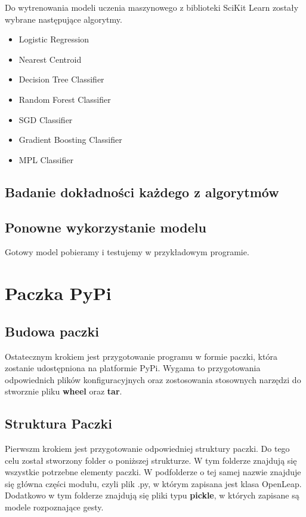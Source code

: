 \quad Do wytrenowania modeli uczenia maszynowego z biblioteki SciKit Learn zostały wybrane następujące algorytmy. 

\begin{itemize}
    \item Logistic Regression
    \item Nearest Centroid 
    \item Decision Tree Classifier 
    \item Random Forest Classifier 
    \item SGD Classifier
    \item Gradient Boosting Classifier
    \item MPL Classifier
\end{itemize}

\subsection{Badanie dokładności każdego z algorytmów}

\subsection{Ponowne wykorzystanie modelu}

\quad Gotowy model pobieramy i testujemy w przykładowym programie. 

\section{Paczka PyPi}

\subsection{Budowa paczki}

\quad Ostatecznym krokiem jest przygotowanie programu w formie paczki, która zostanie udostępniona na platformie PyPi. Wygama to przygotowania odpowiednich plików konfiguracyjnych oraz zostosowania stosownych narzędzi do stworznie pliku \textbf{wheel} oraz \textbf{tar}. 

\subsection{Struktura Paczki}
\quad Pierwszm krokiem jest przygotowanie odpowiedniej struktury paczki. Do tego celu został stworzony folder o poniższej strukturze. W tym folderze znajdują się wszystkie potrzebne elementy paczki. W podfolderze o tej samej nazwie znajduje się główna części modułu, czyli plik .py, w którym zapisana jest klasa OpenLeap. Dodatkowo w tym folderze znajdują się pliki typu \textbf{pickle}, w których zapisane są modele rozpoznające gesty.

